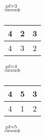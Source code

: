 \documentclass{article}
\begin{document}
\begin{itemize}
\begin{tabular}{|c|c|c|}
                \hline
            \end{tabular}
            $\xRightarrow{\text{pf}=3}$
            \begin{tabular}{|c|c|c|}
                \hline
                4 & 2 & 3\\
                \hline
                4 & 3 & 2\\
                \hline
            \end{tabular}
            $\xRightarrow{\text{pf}=4}$
            \begin{tabular}{|c|c|c|}
                \hline
                4 & 5 & 3\\
                \hline
                4 & 1 & 2\\
                \hline
            \end{tabular}
            $\xRightarrow{\text{pf}=5}$
    \end{itemize}
\end{document}
